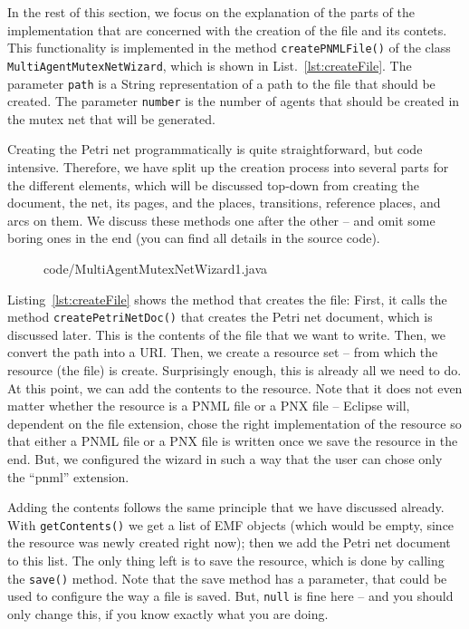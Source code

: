 In the rest of this section, we focus on the explanation of the parts of the
implementation that are concerned with the creation of the file and its contets.
This functionality is implemented in the method {\tt createPNMLFile()} of
the class {\tt MultiAgentMutexNetWizard}, which is shown in
List.~\ref{lst:createFile}. The parameter {\tt path} is a String representation
of a path to the file that should be created. The parameter {\tt number} is the
number of agents that should be created in the mutex net that will be generated.  

Creating the Petri net programmatically is quite straightforward, but code
intensive. Therefore, we have split up the creation process into several parts
for the different elements, which will be discussed top-down from creating
the document, the net, its pages, and the places, transitions, reference
places, and arcs on them. We discuss these methods one after the other --
and omit some boring ones in the end (you can find all details in the
source code).
%
\begin{figure}[bp!] %
%
  {code/MultiAgentMutexNetWizard1.java}
\end{figure}
%
Listing~\ref{lst:createFile} shows the method that creates the
file: First, it calls the method {\tt createPetriNetDoc()} that creates the
Petri net document, which is discussed later. This is the contents of the file
that we want to write. Then, we convert the path into a URI. Then, we create a
resource set%
-- from which the resource (the file) is create. Surprisingly
enough, this is already all we need to do. At this point, we can add the
contents to the resource. Note that it does not even matter whether the
resource is a PNML file or a PNX file -- Eclipse will, dependent on the file
extension, chose the right implementation of the resource so that either a PNML
file or a PNX file is written once we save the resource in the end. But, we
configured the wizard in such a way that the user can chose only
the ``pnml'' extension.

Adding the contents follows the same principle that we have discussed already.
With {\tt getContents()}%
we get a list of EMF objects (which would be empty,
since the resource was newly created right now); then we add the Petri net
document to this list. The only thing left is to save the resource, which is
done by calling the {\tt save()}%
method. Note that the save method has a
parameter, that could be used to configure the way a file is saved. 
But, {\tt null} is fine here -- and you should only change this, if you know
exactly what you are doing.

